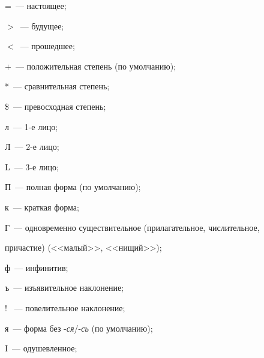=~--- настоящее;





$>$~--- будущее; 





$<$~--- прошедшее;





$+$~--- положительная степень (по умолчанию);





*~--- сравнительная степень;





\$~--- превосходная степень;





л~--- 1-е лицо;





Л~--- 2-е лицо;





L~--- 3-е лицо;





П~--- полная форма (по умолчанию);





к~--- краткая форма;





Г~--- одновременно существительное (прилагательное, числительное, 


при\-час\-тие) (<<малый>>, <<нищий>>);





ф~--- инфинитив;





ъ~--- изъявительное наклонение;





! ~--- повелительное наклонение;





я~--- форма без -\textit{ся}/-\textit{сь} (по умолчанию);





I~--- одушевленное;





